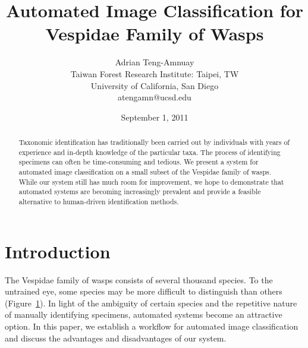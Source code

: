 \documentclass[a4paper,12pt]{article}
\title{Automated Image Classification for Vespidae Family of Wasps}
\author{
	Adrian Teng-Amnuay\\
	Taiwan Forest Research Institute: Taipei, TW\\
	University of California, San Diego\\
	atengamn@ucsd.edu
}
\date{September 1, 2011}
\begin{document}
\maketitle

\begin{singlespace}
\begin{abstract}
	Taxonomic identification has traditionally been carried out by individuals with years of experience and in-depth knowledge of the particular taxa. The process of identifying specimens can often be time-consuming and tedious. We present a system for automated image classification on a small subset of the Vespidae family of wasps. While our system still has much room for improvement, we hope to demonstrate that automated systems are becoming increasingly prevalent and provide a feasible alternative to human-driven identification methods.
\end{abstract}
\end{singlespace}

\section{Introduction}
The Vespidae family of wasps consists of several thousand species. To the untrained eye, some species may be more difficult to distinguish than others (Figure~\ref{fig:comparisons}). In light of the ambiguity of certain species and the repetitive nature of manually identifying specimens, automated systems become an attractive option. In this paper, we establish a workflow for automated image classification and discuss the advantages and disadvantages of our system. 

\begin{figure}[t]
	\centering
	\caption{}
	\label{fig:comparisons}
\end{figure}
\end{document}
